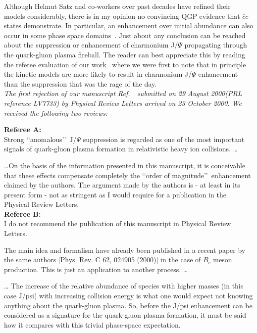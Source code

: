 Although Helmut Satz and co-workers over past decades have refined their models considerably, there is in my opinion no convincing QGP evidence that $\bar c c $ states demonstrate. In particular, an enhancement over initial abundance can also occur in some phase space domains~\cite{Thews:2000rj}. Just about any conclusion can be reached about the suppression or enhancement of charmonium J/$\Psi$ propagating through the quark-gluon plasma fireball. The reader can best appreciate this by reading the referee evaluation of our work~\cite{Thews:2000rj} where we were first to note that in principle the kinetic models are more likely to result in charmonium J/$\Psi$ enhancement than the suppression that was the rage of the day.\\

\noindent \textit{The first rejection of our manuscript Ref.\,~\cite{Thews:2000rj} submitted on 29 August 2000(PRL reference LV7733) by Physical Review Letters arrived on 23 October 2000. We received the following two reviews:}\\[-0.7cm]
%
\begin{mdframed}[linecolor=gray,roundcorner=12pt,backgroundcolor=GreenYellow!15,linewidth=1pt,leftmargin=0cm,rightmargin=0cm,topline=true,bottomline=true,skipabove=12pt]\relax%
%
\textbf{ Referee A:}\\
\indent Strong \lq\lq anomalous\rq\rq\ J/$\Psi$ suppression is regarded as one of the most important signals of quark-gluon plasma formation in relativistic heavy ion collisions. \ldots

\ldots On the basis of the information presented in this manuscript, it is conceivable that these effects compensate completely the \lq\lq order of magnitude\rq\rq\ enhancement claimed by the authors. The argument made by the authors is - at least in its present form - not as stringent as I would require for a publication in the Physical Review Letters.\\
 
\noindent \textbf{Referee B:}\\
\indent I do not recommend the publication of this manuscript in Physical Review Letters.

The main idea and formalism have already been published in a recent paper by the same authors [Phys. Rev. C 62, 024905 (2000)] in the case of $B_c$ meson production. This is just an application to another process. \ldots 

\ldots
The increase of the relative abundance of species with higher masses (in this case J/psi) with increasing collision energy is what one would expect not knowing anything about the quark-gluon plasma. So, before the J/psi enhancement can be considered as a signature for the quark-gluon plasma formation, it must be said how it compares with this trivial phase-space expectation.
\end{mdframed}
\vskip 0.5cm

